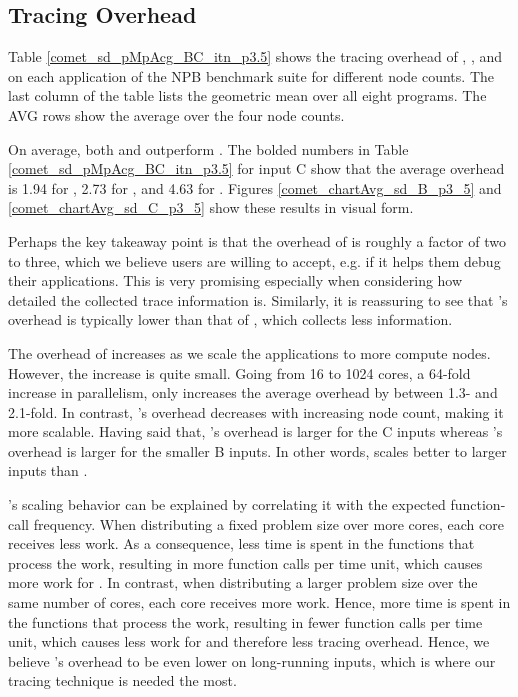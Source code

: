 

\subsection{Tracing Overhead}
\label{subsec:lowtoh}


Table \ref{comet_sd_pMpAcg_BC_itn_p3.5} shows the tracing overhead of \parlotm, \parlota, and \callgrind on each application of the NPB benchmark suite for different node counts. The last column of the table lists the geometric mean over all eight programs. The AVG rows show the average over the four node counts.


On average, both \parlotm and \parlota outperform \callgrind. The bolded numbers in Table \ref{comet_sd_pMpAcg_BC_itn_p3.5} for input C show that the average overhead is 1.94 for \parlotm, 2.73 for \parlota, and 4.63 for \callgrind. Figures \ref{comet_chartAvg_sd_B_p3_5} and \ref{comet_chartAvg_sd_C_p3_5} show these results in visual form.


Perhaps the key takeaway point is that the overhead of \parlot is roughly a factor of two to three, which we believe users are willing to accept, e.g. if it helps them debug their applications. This is very promising especially when considering how detailed the collected trace information is. Similarly, it is reassuring to see that \parlot 's overhead is typically lower than that of \callgrind, which collects less information.

The overhead of \parlot increases as we scale the applications to more compute nodes. However, the increase is quite small. Going from 16 to 1024 cores, a 64-fold increase in parallelism, only increases the average overhead by between 1.3- and 2.1-fold. In contrast, \callgrind 's overhead decreases with increasing node count, making it more scalable. Having said that, \callgrind 's overhead is larger for the C inputs whereas \parlot 's overhead is larger for the smaller B inputs. In other words, \parlot scales better to larger inputs than \callgrind.



\parlot 's scaling behavior can be explained by correlating it with the expected function-call frequency. When distributing a fixed problem size over more cores, each core receives less work. As a consequence, less time is spent in the functions that process the work, resulting in more function calls per time unit, which causes more work for \parlot. In contrast, when distributing a larger problem size over the same number of cores, each core receives more work. Hence, more time is spent in the functions that process the work, resulting in fewer function calls per time unit, which causes less work for \parlot and therefore less tracing overhead. Hence, we believe \parlot 's overhead to be even lower on long-running inputs, which is where our tracing technique is needed the most.



